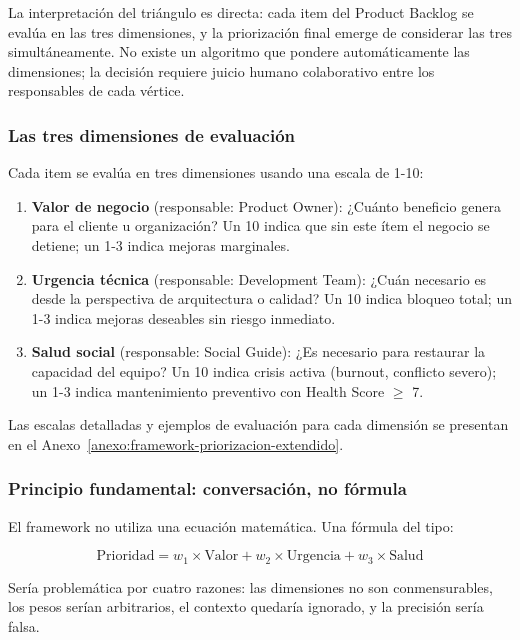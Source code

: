 La interpretación del triángulo es directa: cada item del Product Backlog se evalúa en las tres dimensiones, y la priorización final emerge de considerar las tres simultáneamente. No existe un algoritmo que pondere automáticamente las dimensiones; la decisión requiere juicio humano colaborativo entre los responsables de cada vértice.

\subsubsection{Las tres dimensiones de evaluación}

Cada item se evalúa en tres dimensiones usando una escala de 1-10:

\begin{enumerate}
    \item \textbf{Valor de negocio} (responsable: Product Owner): ¿Cuánto beneficio genera para el cliente u organización? Un 10 indica que sin este ítem el negocio se detiene; un 1-3 indica mejoras marginales.

    \item \textbf{Urgencia técnica} (responsable: Development Team): ¿Cuán necesario es desde la perspectiva de arquitectura o calidad? Un 10 indica bloqueo total; un 1-3 indica mejoras deseables sin riesgo inmediato.

    \item \textbf{Salud social} (responsable: Social Guide): ¿Es necesario para restaurar la capacidad del equipo? Un 10 indica crisis activa (burnout, conflicto severo); un 1-3 indica mantenimiento preventivo con Health Score $\geq$ 7.
\end{enumerate}

Las escalas detalladas y ejemplos de evaluación para cada dimensión se presentan en el Anexo~\ref{anexo:framework-priorizacion-extendido}.

\subsubsection{Principio fundamental: conversación, no fórmula}

El framework no utiliza una ecuación matemática. Una fórmula del tipo:

\begin{equation}
    \text{Prioridad} = w_1 \times \text{Valor} + w_2 \times \text{Urgencia} + w_3 \times \text{Salud}
\end{equation}

Sería problemática por cuatro razones: las dimensiones no son conmensurables, los pesos serían arbitrarios, el contexto quedaría ignorado, y la precisión sería falsa.

